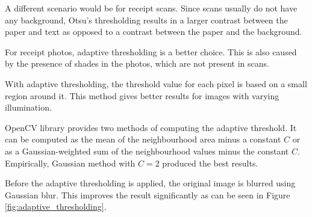\documentclass[
  digital, %
  table,   %
  oneside, %
  lof,     %
  lot,     %
]{fithesis3}
\begin{document}
A different scenario would be for receipt scans. Since scans usually do not have any background, Otsu's thresholding results in a larger contrast between the paper and text as opposed to a contrast between the paper and the background.

For receipt photos, adaptive thresholding is a better choice. This is also caused by the presence of shades in the photos, which are not present in scans.

With adaptive thresholding, the threshold value for each pixel is based on a small region around it. This method gives better results for images with varying illumination. \cite{OpenCVThresholding}

OpenCV library provides two methods of computing the adaptive threshold. It can be computed as the mean of the neighbourhood area minus a constant $C$ or as a Gaussian-weighted sum of the neighbourhood values minus the constant $C$. Empirically, Gaussian method with $C = 2$ produced the best results.

Before the adaptive thresholding is applied, the original image is blurred using Gaussian blur. This improves the result significantly as can be seen in Figure \ref{fig:adaptive_thresholding}.
\end{document}
